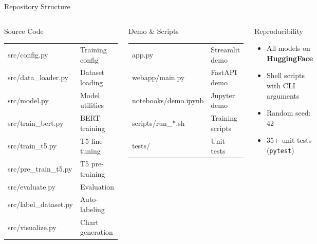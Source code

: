 \documentclass[10pt, aspectratio=169]{beamer}
\begin{document}
\begin{frame}[shrink=8]{Repository Structure}
  \begin{columns}[T]
    \begin{block}{Source Code}
      \small\ttfamily
      \begin{tabular}{ll}
        src/config.py          & Training config \\
        src/data\_loader.py    & Dataset loading \\
        src/model.py           & Model utilities \\
        src/train\_bert.py     & BERT training \\
        src/train\_t5.py       & T5 fine-tuning \\
        src/pre\_train\_t5.py  & T5 pre-training \\
        src/evaluate.py        & Evaluation \\
        src/label\_dataset.py  & Auto-labeling \\
        src/visualize.py       & Chart generation \\
      \end{tabular}
    \end{block}

    \begin{block}{Demo \& Scripts}
      \small\ttfamily
      \begin{tabular}{ll}
        app.py                  & Streamlit demo \\
        webapp/main.py          & FastAPI demo \\
        notebooks/demo.ipynb    & Jupyter demo \\
        scripts/run\_*.sh       & Training scripts \\
        tests/                  & Unit tests \\
      \end{tabular}
    \end{block}
    \vspace{0.2cm}
    \begin{exampleblock}{Reproducibility}
      \begin{itemize}
        \item All models on \textbf{HuggingFace}
        \item Shell scripts with CLI arguments
        \item Random seed: 42
        \item 35+ unit tests (\texttt{pytest})
      \end{itemize}
    \end{exampleblock}
  \end{columns}
\end{frame}
\end{document}
